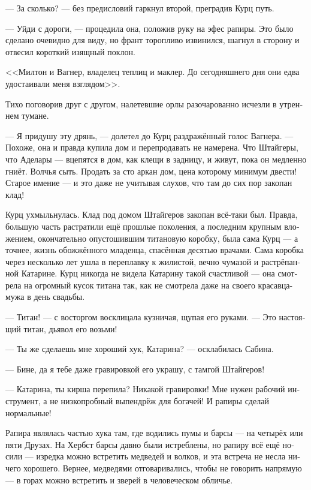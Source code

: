 \documentclass[a4paper,12pt,fleqn]{book}\usepackage{polyglossia}\setdefaultlanguage[babelshorthands=true]{russian}\setotherlanguage{english}\defaultfontfeatures{Ligatures=TeX,Mapping=tex-text}\usepackage{xcolor}\newcommand{\ml}[3]{#2}
\begin{document}
--- За сколько? --- без предисловий гаркнул второй, преградив Курц путь.

\ml{$0$}
{--- Уйди с дороги, --- процедила она, положив руку на эфес рапиры.}
{``You're on my way, man,'' she hissed with her hand on the foil hilt.}
Это было сделано очевидно для виду, но франт торопливо извинился, шагнул в сторону и отвесил короткий изящный поклон.

<<Милтон и Вагнер, владелец теплиц и маклер.
До сегодняшнего дня они едва удостаивали меня взглядом>>.

Тихо поговорив друг с другом, налетевшие орлы разочарованно исчезли в утреннем тумане.

--- Я придушу эту дрянь, --- долетел до Курц раздражённый голос Вагнера.
--- Похоже, она и правда купила дом и перепродавать не намерена.
Что Штайгеры, что Аделары --- вцепятся в дом, как клещи в задницу, и живут, пока он медленно гниёт.
Волчья сыть.
Продать за сто аркан дом, цена которому минимум двести!
Старое имение --- и это даже не учитывая слухов, что там до сих пор закопан клад!

Курц ухмыльнулась.
Клад под домом Штайгеров закопан всё-таки был.
Правда, большую часть растратили ещё прошлые поколения, а последним крупным вложением, окончательно опустошившим титановую коробку, была сама Курц --- а точнее, жизнь обожжённого младенца, спасённая десятью врачами.
Сама коробка через несколько лет ушла в переплавку к жилистой, вечно чумазой и растрёпанной Катарине.
Курц никогда не видела Катарину такой счастливой --- она смотрела на огромный кусок титана так, как не смотрела даже на своего красавца-мужа в день свадьбы.

--- Титан! --- с восторгом восклицала кузничая, щупая его руками.
--- Это настоящий титан, дьявол его возьми!

--- Ты же сделаешь мне хороший хук, Катарина? --- осклабилась Сабина.

--- Бине, да я тебе даже гравировкой его украшу, с тамгой Штайгеров!

--- Катарина, ты кирша перепила?
Никакой гравировки!
Мне нужен рабочий инструмент, а не низкопробный выпендрёж для богачей!
И рапиры сделай нормальные!

Рапира являлась частью хука там, где водились пумы и барсы --- на четырёх или пяти Друзах.
На Хербст барсы давно были истреблены, но рапиру всё ещё носили --- изредка можно встретить медведей и волков, и эта встреча не несла ничего хорошего.
Вернее, медведями отговаривались, чтобы не говорить напрямую --- в горах можно встретить и зверей в человеческом обличье.
\end{document}
